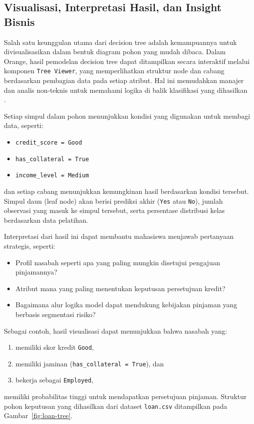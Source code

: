 \subsection{Visualisasi, Interpretasi Hasil, dan Insight Bisnis}

Salah satu keunggulan utama dari decision tree adalah kemampuannya untuk divisualisasikan dalam bentuk diagram pohon yang mudah dibaca. Dalam Orange, hasil pemodelan decision tree dapat ditampilkan secara interaktif melalui komponen \texttt{Tree Viewer}, yang memperlihatkan struktur node dan cabang berdasarkan pembagian data pada setiap atribut. Hal ini memudahkan manajer dan analis non-teknis untuk memahami logika di balik klasifikasi yang dihasilkan \cite{camm2020business}.

Setiap simpul dalam pohon menunjukkan kondisi yang digunakan untuk membagi data, seperti:
\begin{itemize}
	\item \texttt{credit\_score = Good}
	\item \texttt{has\_collateral = True}
	\item \texttt{income\_level = Medium}
\end{itemize}
dan setiap cabang menunjukkan kemungkinan hasil berdasarkan kondisi tersebut. Simpul daun (leaf node) akan berisi prediksi akhir (\texttt{Yes} atau \texttt{No}), jumlah observasi yang masuk ke simpul tersebut, serta persentase distribusi kelas berdasarkan data pelatihan.

Interpretasi dari hasil ini dapat membantu mahasiswa menjawab pertanyaan strategis, seperti:
\begin{itemize}
	\item Profil nasabah seperti apa yang paling mungkin disetujui pengajuan pinjamannya?
	\item Atribut mana yang paling menentukan keputusan persetujuan kredit?
	\item Bagaimana alur logika model dapat mendukung kebijakan pinjaman yang berbasis segmentasi risiko?
\end{itemize}

Sebagai contoh, hasil visualisasi dapat menunjukkan bahwa nasabah yang:
\begin{enumerate}
	\item memiliki skor kredit \texttt{Good},
	\item memiliki jaminan (\texttt{has\_collateral = True}), dan
	\item bekerja sebagai \texttt{Employed},
\end{enumerate}
memiliki probabilitas tinggi untuk mendapatkan persetujuan pinjaman. Struktur pohon keputusan yang dihasilkan dari dataset \texttt{loan.csv} ditampilkan pada Gambar~\ref{fig:loan-tree}.

